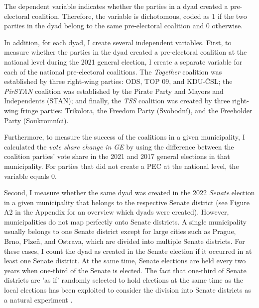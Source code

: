\documentclass[]{interact}
\theoremstyle{plain}%
\theoremstyle{definition}
\theoremstyle{remark}
\begin{document}
The dependent variable indicates whether the parties in a dyad created a pre-electoral coalition. Therefore, the variable is dichotomous, coded as 1 if the two parties in the dyad belong to the same pre-electoral coalition and 0 otherwise. 

In addition, for each dyad, I create several independent variables. 
First, to measure whether the parties in the dyad created a pre-electoral coalition at the national level during the 2021 general election, I create a separate variable for each of the national pre-electoral coalitions. The \emph{Together} coalition was established by three right-wing parties: ODS, TOP 09, and KDU-ČSL; the \emph{PirSTAN} coalition was established by the Pirate Party and Mayors and Independents (STAN); and finally, the \emph{TSS} coalition was created by three right-wing fringe parties: Trikolora, the Freedom Party (Svobodní), and the Freeholder Party (Soukromníci). 

Furthermore, to measure the success of the coalitions in a given municipality, I calculated the \emph{vote share change in GE} by using the difference between the coalition parties' vote share in the 2021 and 2017 general elections in that municipality. For parties that did not create a PEC at the national level, the variable equals 0.

Second, I measure whether the same dyad was created in the 2022 \emph{Senate} election in a given municipality that belongs to the respective Senate district (see Figure A2 in the Appendix for an overview which dyads were created). However, municipalities do not map perfectly onto Senate districts. A single municipality usually belongs to one Senate district except for large cities such as Prague, Brno, Plzeň, and Ostrava, which are divided into multiple Senate districts. For these cases, I count the dyad as created in the Senate election if it occurred in at least one Senate district.
At the same time, Senate elections are held every two years when one-third of the Senate is elected. The fact that one-third of Senate districts are 'as if' randomly selected to hold elections at the same time as the local elections has been exploited to consider the division into Senate districts as a natural experiment \citep[cf.][]{roberts2018,lysek2022}. 
\end{document}
